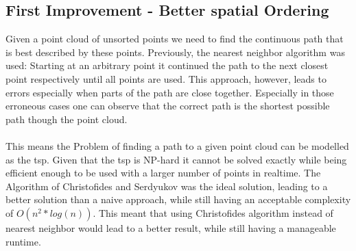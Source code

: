 \subsection{First Improvement - Better spatial Ordering}
Given a point cloud of unsorted points we need to find the continuous path that is best described by these points. Previously, the nearest neighbor algorithm was used: Starting at an arbitrary point it continued the path to the next closest point respectively until all points are used. This approach, however, leads to errors especially when parts of the path are close together. Especially in those erroneous cases one can observe that the correct path is the shortest possible path though the point cloud. \\\\
 This means the Problem of finding a path to a given point cloud can be modelled as the \ac{tsp}. Given that the \ac{tsp} is NP-hard\cite{Korte2008} it cannot be solved exactly while being efficient enough to be used with a larger number of points in realtime. The Algorithm of Christofides and Serdyukov was the ideal solution, leading to a better solution than a naive approach, while still having an acceptable complexity of $O(n^2 * log(n))$\cite{Christofides2022}. This meant that using Christofides algorithm instead of nearest neighbor would lead to a better result, while still having a manageable runtime. 

